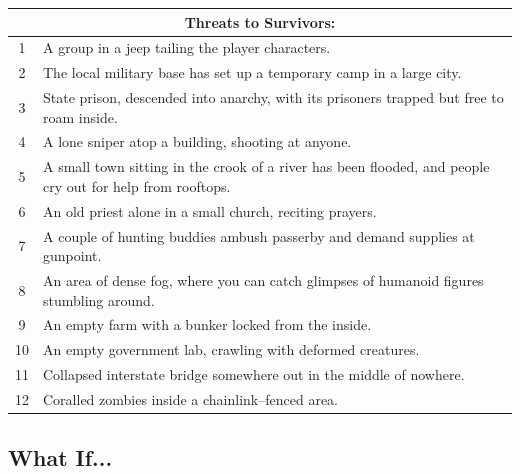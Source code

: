 \documentclass[landscape]{book}
\begin{document}
\begin{multicols*}{4}
\columnbreak
\begin{center}
  \begin{tabular}{|c|p{}|}
    \hline \multicolumn{2}{|c|}{Threats to Survivors:} \\
    \hline 1 & A group in a jeep tailing the player characters. \\
    2 & The local military base has set up a temporary camp in a large city. \\
    3 & State prison, descended into anarchy, with its prisoners trapped but free to roam inside. \\
    4 & A lone sniper atop a building, shooting at anyone. \\
    5 & A small town sitting in the crook of a river has been flooded, and people cry out for help from rooftops. \\
    6 & An old priest alone in a small church, reciting prayers. \\
    7 & A couple of hunting buddies ambush passerby and demand supplies at gunpoint. \\
    8 & An area of dense fog, where you can catch glimpses of humanoid figures stumbling around. \\
    9 & An empty farm with a bunker locked from the inside.  \\
    10 & An empty government lab, crawling with deformed creatures. \\
    11 & Collapsed interstate bridge somewhere out in the middle of nowhere. \\
    12 & Coralled zombies inside a chainlink--fenced area. \\ \hline
  \end{tabular}
\end{center}

\subsection*{What If...}


\end{multicols*}
\end{document}
